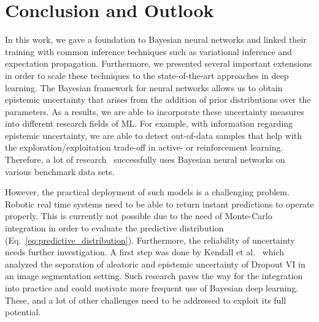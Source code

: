 \documentclass[runningheads]{llncs}
\begin{document}
\section{Conclusion and Outlook}
\label{sec:conclusion_outlook}
In this work, we gave a foundation to Bayesian neural networks and linked their training with common inference techniques such as variational inference and expectation propagation.
Furthermore, we presented several important extensions in order to scale these techniques to the state-of-the-art approaches in deep learning.
The Bayesian framework for neural networks allows us to obtain epistemic uncertainty that arises from the addition of prior distributions over the parameters.
As a results, we are able to incorporate these uncertainty measures into different research fields of ML.
For example, with information regarding epistemic uncertainty, we are able to detect out-of-data samples that help with the exploration/exploitation trade-off in active- or reinforcement learning. 
Therefore, a lot of research~\cite{BlundellBBB, gal2017deep, hernandez2015probabilistic, Gal2016Uncertainty} successfully uses Bayesian neural networks on various benchmark data sets.

However, the practical deployment of such models is a challenging problem.
Robotic real time systems need to be able to return instant predictions to operate properly.
This is currently not possible due to the need of Monte-Carlo integration in order to evaluate the predictive distribution (Eq.~\ref{eq:predictive_distribution}).
Furthermore, the reliability of uncertainty needs further investigation. 
A first step was done by Kendall et al.~\cite{Kendall2017Uncertainy} which analyzed the separation of aleatoric and epistemic uncertainty of Dropout VI in an image segmentation setting.
Such research paves the way for the integration into practice and could motivate more frequent use of Bayesian deep learning.
These, and a lot of other challenges need to be addressed to exploit its full potential.%




\newpage
\end{document}
